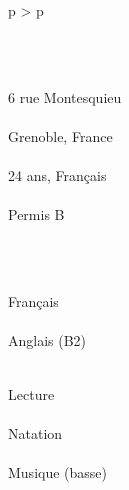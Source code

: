 \documentclass[cv]{cv_style}
\begin{document}
{\begin{tabular}{p{\leftsize\textwidth} > {\arraybackslash}p{\rightsize\textwidth}}
\begin{minipage}[t]{\leftsize\textwidth}
        \vspace{0.2cm}\\

        \vspace{-0.50cm}\\
        \begin{flushright}
            6 rue Montesquieu\\
						\vspace{.1cm}\\
            Grenoble, France \\
						\vspace{.1cm}\\
            24 ans, Français  \\
						\vspace{.1cm}\\
            Permis B
        \end{flushright}

        \vspace{0.6cm}\\
        
        
            \vspace{-0.3cm}\\
            \begin{flushright}
                    
                          Français\\
						\vspace{.1cm}\\
                          Anglais (B2)
            \end{flushright}

        \vspace{0.5cm} 

        \begin{flushright}
            \vspace{-0.35cm}\\
            \small
            Lecture\\ 
						\vspace{.1cm}\\
						Natation \\
						\vspace{.1cm}\\
						 Musique (basse)\\ 
        \end{flushright}
            

\end{minipage}
\end{tabular}}
\end{document}
